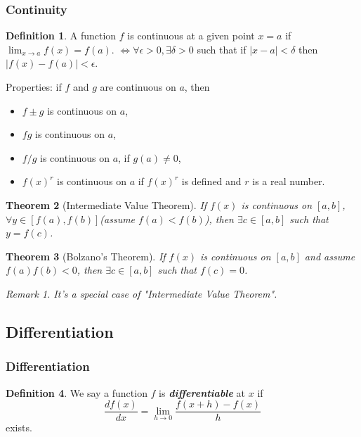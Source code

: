 \documentclass{amsart}
\newtheorem{theorem}{Theorem}[section]
\theoremstyle{definition}
\newtheorem{definition}[theorem]{Definition}
\theoremstyle{remark}
\newtheorem*{remark*}{Remark}
\numberwithin{equation}{section}
\begin{document}
\subsubsection{Continuity}

\begin{definition}
    A function $f$ is continuous at a given point $x=a$ if $\lim_{x \to a} f(x) = f(a)$. $\iff \forall \epsilon > 0, \exists \delta > 0$ such that if $|x-a|<\delta$ then $|f(x) - f(a)| < \epsilon$.
\end{definition}

Properties: if $f$ and $g$ are continuous on $a$, then
\begin{itemize}
    \item $f \pm g$ is continuous on $a$,
    \item $fg$ is continuous on $a$,
    \item $f / g$ is continuous on $a$, if $g(a) \neq 0$,
    \item $f(x)^{r}$ is continuous on $a$ if $f(x)^{r}$ is defined and $r$ is a real number.
\end{itemize}


\begin{theorem}[Intermediate Value Theorem]
    If $f(x)$ is continuous on $[a,b]$, $\forall y \in [f(a), f(b)]$(assume $f(a) < f(b)$), then $\exists c \in [a,b]$ such that $y=f(c)$.
\end{theorem}

\begin{theorem}[Bolzano's Theorem]
    If $f(x)$ is continuous on $[a,b]$ and assume $f(a)f(b)<0$, then $\exists c \in [a,b]$ such that $f(c) = 0$.
    \begin{remark*}
        It's a special case of "Intermediate Value Theorem".
    \end{remark*}
\end{theorem}

\subsection{Differentiation}

\subsubsection{Differentiation}

\begin{definition}
    We say a function $f$ is \textit{\textbf{differentiable}} at $x$ if
    \begin{equation*}
        \frac{d f(x)}{dx} = \lim_{h \to 0}\frac{f(x+h)-f(x)}{h}
    \end{equation*}
    exists.
\end{definition}
\end{document}
